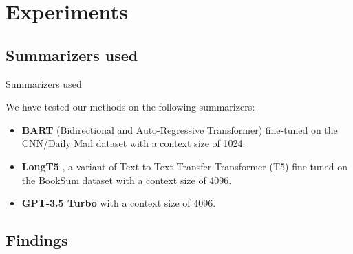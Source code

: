 \section{Experiments}


\subsection{Summarizers used}

\begin{frame}{Summarizers used}

	We have tested our methods on the following summarizers:
	
	\begin{itemize}
		\item \textbf{BART} (Bidirectional and Auto-Regressive Transformer)
		\citep{lewis-etal-2020-bart} fine-tuned on the CNN/Daily Mail dataset
		with a context size of 1024.
		\item \textbf{LongT5} \citep{guo2021longt5}, a variant of Text-to-Text
		Transfer Transformer (T5) \citep{raffel2020exploring} fine-tuned on the
		BookSum dataset with a context size of 4096.
		\item \textbf{GPT-3.5 Turbo} \citep{brown2020language} with a context
		size of 4096.
	\end{itemize}
	
\end{frame}


\subsection{Findings}

